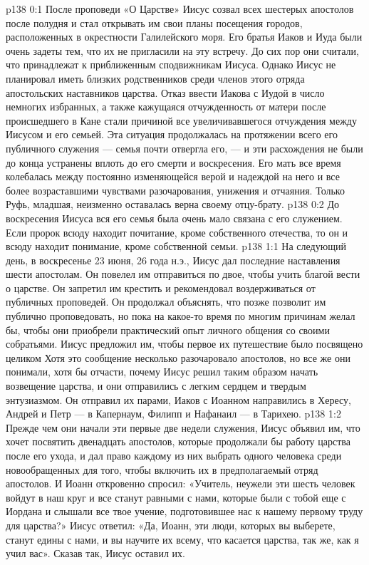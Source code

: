 \vs p138 0:1 После проповеди «О Царстве» Иисус созвал всех шестерых апостолов после полудня и стал открывать им свои планы посещения городов, расположенных в окрестности Галилейского моря. Его братья Иаков и Иуда были очень задеты тем, что их не пригласили на эту встречу. До сих пор они считали, что принадлежат к приближенным сподвижникам Иисуса. Однако Иисус не планировал иметь близких родственников среди членов этого отряда апостольских наставников царства. Отказ ввести Иакова с Иудой в число немногих избранных, а также кажущаяся отчужденность от матери после происшедшего в Кане стали причиной все увеличивавшегося отчуждения между Иисусом и его семьей. Эта ситуация продолжалась на протяжении всего его публичного служения --- семья почти отвергла его, --- и эти расхождения не были до конца устранены вплоть до его смерти и воскресения. Его мать все время колебалась между постоянно изменяющейся верой и надеждой на него и все более возраставшими чувствами разочарования, унижения и отчаяния. Только Руфь, младшая, неизменно оставалась верна своему отцу\hyp{}брату.
\vs p138 0:2 До воскресения Иисуса вся его семья была очень мало связана с его служением. Если пророк всюду находит почитание, кроме собственного отечества, то он и всюду находит понимание, кроме собственной семьи.
\vs p138 1:1 На следующий день, в воскресенье 23 июня, 26 года н.э., Иисус дал последние наставления шести апостолам. Он повелел им отправиться по двое, чтобы учить благой вести о царстве. Он запретил им крестить и рекомендовал воздерживаться от публичных проповедей. Он продолжал объяснять, что позже позволит им публично проповедовать, но пока на какое\hyp{}то время по многим причинам желал бы, чтобы они приобрели практический опыт личного общения со своими собратьями. Иисус предложил им, чтобы первое их путешествие было посвящено целиком  Хотя это сообщение несколько разочаровало апостолов, но все же они понимали, хотя бы отчасти, почему Иисус решил таким образом начать возвещение царства, и они отправились с легким сердцем и твердым энтузиазмом. Он отправил их парами, Иаков с Иоанном направились в Хересу, Андрей и Петр --- в Капернаум, Филипп и Нафанаил --- в Тарихею.
\vs p138 1:2 Прежде чем они начали эти первые две недели служения, Иисус объявил им, что хочет посвятить двенадцать апостолов, которые продолжали бы работу царства после его ухода, и дал право каждому из них выбрать одного человека среди новообращенных для того, чтобы включить их в предполагаемый отряд апостолов. И Иоанн откровенно спросил: «Учитель, неужели эти шесть человек войдут в наш круг и все станут равными с нами, которые были с тобой еще с Иордана и слышали все твое учение, подготовившее нас к нашему первому труду для царства?» Иисус ответил: «Да, Иоанн, эти люди, которых вы выберете, станут едины с нами, и вы научите их всему, что касается царства, так же, как я учил вас». Сказав так, Иисус оставил их.
